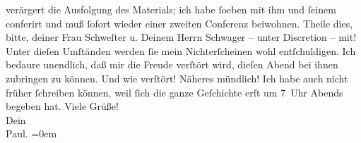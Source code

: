 \begin{ledgroupsized}[t]{13cm}
               verärgert die Ausfolgung des Materials; ich habe ſoeben mit ihm und ſeinem \label{K_L02652-2v}\label{K_L02652-2h} conferirt und
               muß ſofort wieder einer zweiten Conferenz beiwohnen. Theile dies, bitte, deiner Frau
                  Schweſter u. Deinem Herrn
                  Schwager – unter
               Discretion – mit! Unter dieſen Umſtänden {\pb}werden ſie mein Nichterſcheinen
               wohl entſchuldigen. Ich bedaure unendlich, daß mir die Freude verſtört wird, dieſen
               Abend bei ihnen zubringen zu können. Und wie verſtört! Näheres mündlich!\pend
           \pstart
           Ich habe auch nicht früher ſchreiben können, weil ſich die ganze Geſchichte erſt um
                  7 Uhr Abends begeben hat.\pend
           \pstart
           Viele Grüße!{\\[\baselineskip]}Dein{\\[\baselineskip]}\spacefill\mbox{Paul.}\pend
           \leftskip=0em{}\endnumbering{}\end{ledgroupsized}  \newcommand{\dateiname}{L02652}\newcommand{\titel}{Paul Goldmann an Arthur Schnitzler, 20. 12. 1890}\newcommand{\editorInnen}{Martin Anton Müller und Laura Untner}
            \footnotesize
\begin{ledgroupsized}[t]{11.5cm}
\end{ledgroupsized}
         
      